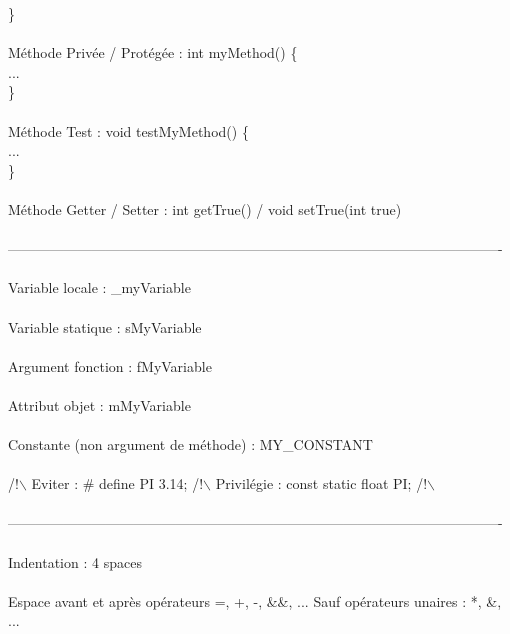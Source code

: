 		   \}
\\ \\
Méthode Privée / Protégée : int myMethod() \{ \\
			    ... \\
		            \}
\\ \\
Méthode Test : void testMyMethod() \{ \\
	       ... \\
	       \}
\\ \\
Méthode Getter / Setter : int getTrue() / void setTrue(int true)
\\ \\
----------------------------------------------------------------------------------------------------------
\\ \\
Variable locale : \_myVariable
\\ \\
Variable statique : sMyVariable
\\ \\
Argument fonction : fMyVariable
\\ \\
Attribut objet : mMyVariable
\\ \\
Constante (non argument de méthode) : MY\_CONSTANT
\\ \\
/!$\backslash$  Eviter : \# define PI 3.14; /!$\backslash$  Privilégie : const static float PI; /!$\backslash$
\\ \\
----------------------------------------------------------------------------------------------------------
\\ \\
Indentation : 4 spaces
\\ \\
Espace avant et après opérateurs  =, +, -, \&\&, ... Sauf opérateurs unaires : *, \&, ...
\\ \\
